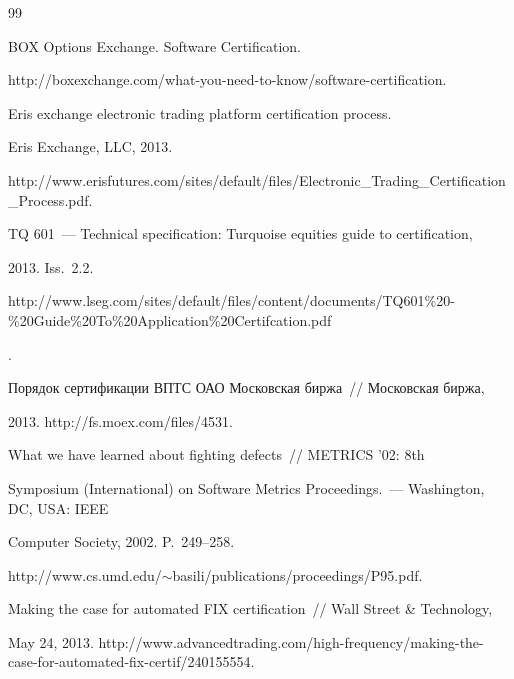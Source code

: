 {{\begin{thebibliography}{99}


BOX Options Exchange. Software Certification.


{\sf http://boxexchange.com/what-you-need-to-know/software-certification}.







Eris exchange electronic trading platform certification process.


Eris Exchange, LLC, 2013.


{\sf http://www.erisfutures.com/sites/default/files/Electronic\_\linebreak  Trading\_Certification\_Process.pdf}.







TQ 601~--- Technical specification: Turquoise equities guide to certification,


2013. Iss.~2.2. {\sf


http://www.lseg.com/sites/default/files/content/documents/TQ601\%20-\%20Guide\%20To\%20Application\%20Certifcation.pdf}.







  Порядок сертификации ВПТС ОАО Московская биржа~/\!\!/ Московская биржа,


2013. {\sf http://fs.moex.com/files/4531}.







 What we have learned about fighting defects~/\!\!/ METRICS '02: 8th


Symposium (International) on Software Metrics Proceedings.~--- Washington, DC, USA: IEEE


Computer Society, 2002. P.~249--258.


{\sf http://www.cs.umd.edu/$\sim$basili/publications/proceedings/P95.pdf}.




 Making the case for automated FIX certification~/\!\!/ Wall Street \& Technology,


May 24, 2013. {\sf http://www.advancedtrading.com/high-frequency/making-the-case-for-automated-fix-certif/240155554}.






\end{thebibliography}}}
